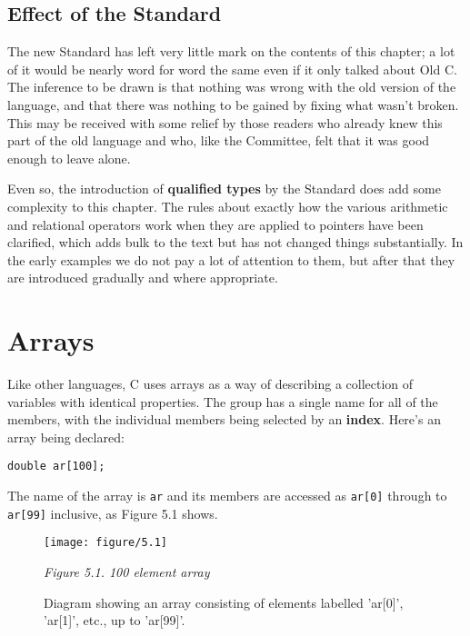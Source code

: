   

  \subsection{Effect of the Standard}
   

   The new Standard has left very little mark on the contents of this
    chapter; a lot of it would be nearly word for word the same even if it
    only talked about Old C. The inference to be drawn is that nothing was
    wrong with the old version of the language, and that there was nothing
    to be gained by fixing what wasn't broken. This may be received with
    some relief by those readers who already knew this part of the old
    language and who, like the Committee, felt that it was good enough to
    leave alone.


   Even so, the introduction of \textbf{qualified types} by the
    Standard does add some complexity to this chapter. The rules about
    exactly how the various arithmetic and relational operators work when
    they are applied to pointers have been clarified, which adds bulk to the
    text but has not changed things substantially. In the early examples we
    do not pay a lot of attention to them, but after that they are
    introduced gradually and where appropriate.


  

 
        \section{Arrays}
        

  

  Like other languages, C uses arrays as a way of describing a collection
   of variables with identical properties. The group has a single name for
   all of the members, with the individual members being selected by an
   \textbf{index}. Here's an array being declared:


  \begin{Verbatim}
double ar[100];
\end{Verbatim}

  The name of the array is \texttt{ar} and its members are accessed
   as \texttt{ar[0]} through to \texttt{ar[99]} inclusive, as
   Figure 5.1 shows.


   \begin{figure*}[htb]\centering
     \texttt{[image: figure/5.1]}
     \caption{Diagram showing an array consisting of elements labelled 'ar[0]',           'ar[1]', etc., up to 'ar[99]'.}
     \begin{center}\textit{Figure 5.1. 100 element array}\end{center}
   \end{figure*}




